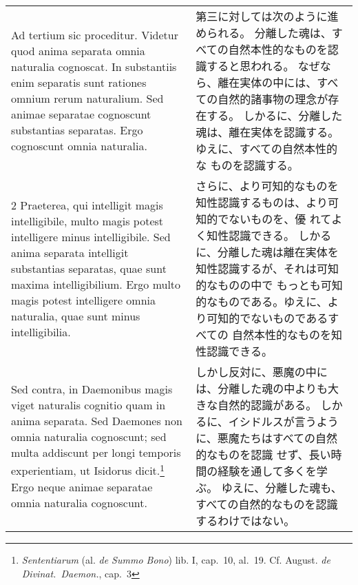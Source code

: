 \documentclass[10pt]{jsarticle} %
\begin{document}
\begin{longtable}{p{21em}p{21em}}


{\huge A}{\sc d tertium sic proceditur}. Videtur quod anima separata
 omnia naturalia cognoscat. In substantiis enim separatis sunt rationes
 omnium rerum naturalium. Sed animae separatae cognoscunt substantias
 separatas. Ergo cognoscunt omnia naturalia.

&

第三に対しては次のように進められる。
分離した魂は、すべての自然本性的なものを認識すると思われる。
なぜなら、離在実体の中には、すべての自然的諸事物の理念が存在する。
しかるに、分離した魂は、離在実体を認識する。ゆえに、すべての自然本性的な
 ものを認識する。

\\




2 {\sc Praeterea}, qui intelligit magis intelligibile, multo magis
 potest intelligere minus intelligibile. Sed anima separata intelligit
 substantias separatas, quae sunt maxima intelligibilium. Ergo multo
 magis potest intelligere omnia naturalia, quae sunt minus
 intelligibilia.

&

さらに、より可知的なものを知性認識するものは、より可知的でないものを、優
 れてよく知性認識できる。
しかるに、分離した魂は離在実体を知性認識するが、それは可知的なものの中で
 もっとも可知的なものである。ゆえに、より可知的でないものであるすべての
 自然本性的なものを知性認識できる。


\\




{\sc Sed contra}, in Daemonibus magis viget
 naturalis cognitio quam in
 anima separata. Sed Daemones non omnia naturalia cognoscunt; sed multa
 addiscunt per longi temporis experientiam, ut Isidorus
 dicit.\footnote{{\it Sententiarum} (al. {\it de Summo Bono}) lib. I,
 cap.~10, al.~19. Cf. August. {\it de Divinat.~Daemon.}, cap.~3} Ergo
 neque animae separatae omnia naturalia cognoscunt.

&

しかし反対に、悪魔の中には、分離した魂の中よりも大きな自然的認識がある。
 しかるに、イシドルスが言うように、悪魔たちはすべての自然的なものを認識
 せず、長い時間の経験を通して多くを学ぶ。
ゆえに、分離した魂も、すべての自然的なものを認識するわけではない。



\end{longtable}
\end{document}
